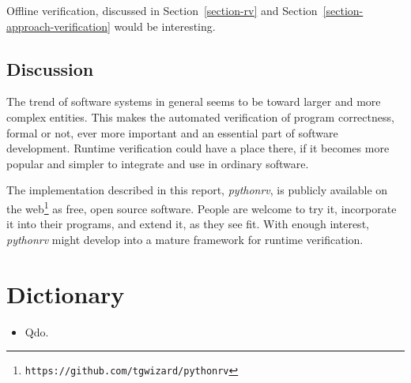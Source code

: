 \documentclass[a4paper,11pt]{kth-mag}
\begin{document}
Offline verification, discussed in Section~\ref{section-rv} and
Section~\ref{section-approach-verification} would be interesting.

\section{Discussion}

The trend of software systems in general seems to be toward larger and more
complex entities. This makes the automated verification of program
correctness, formal or not, ever more important and an essential part of
software development. Runtime verification could have a place there, if it
becomes more popular and simpler to integrate and use in ordinary software.

The implementation described in this report, \textit{pythonrv}, is publicly
available on the web\footnote{\texttt{https://github.com/tgwizard/pythonrv}} as
free, open source software. People are welcome to try it, incorporate it into
their programs, and extend it, as they see fit. With enough interest,
\textit{pythonrv} might develop into a mature framework for runtime
verification.












\appendix
\addappheadtotoc

\chapter{Dictionary} \label{appendix-dictionary}

\begin{itemize}
  \item Qdo.
\end{itemize}
\end{document}
